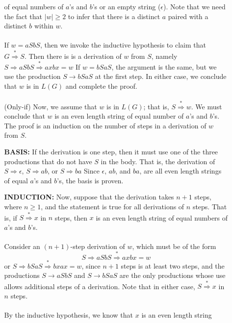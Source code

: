 \documentclass[]{article}
\begin{document}
\begin{enumerate}
\begin{enumerate}
        of equal numbers of $a$'s and $b$'s or an empty string ($\epsilon$).
        Note that we need the fact that $|w| \geq 2$ to infer that there is a
        distinct $a$ paired with a distinct $b$ within $w$. \\ \\
        If $w = aSbS$, then we invoke the inductive hypothesis to claim that
        $G\overset{*}{\Rightarrow} S$. Then there is is a derivation of $w$
        from $S$, namely $S \Rightarrow aSbS \overset{*}{\Rightarrow} axbx = w$
        If $w = bSaS$, the argument is the same, but we use the production
        $S \rightarrow bSaS$ at the first step. In either case, we conclude
        that $w$ is in $L(G)$ and complete the proof. \\ \\
        (Only-if) Now, we assume that $w$ is in $L(G)$; that is,
        $S \overset{*}{\Rightarrow} w$. We must conclude that $w$ is an even
        length string of equal number of $a$'s and $b$'s. The proof is an
        induction on the number of steps in a derivation of $w$ from $S$.
        \item[\textbf{BASIS:}] If the derivation is one step, then it must use
        one of the three productions that do not have $S$ in the body. That is,
        the derivation of $S \Rightarrow \epsilon$, $S \Rightarrow ab$, or
        $S \Rightarrow ba$ Since $\epsilon$, $ab$, and $ba$, are all even
        length strings of equal $a$'s and $b$'s, the basis is proven.
        \item[\textbf{INDUCTION:}] Now, suppose that the derivation takes $n+1$
        steps, where $n \geq 1$, and the statement is true for all derivations
        of $n$ steps. That is, if $S \overset{*}{\Rightarrow} x$ in $n$ steps,
        then $x$ is an even length string of equal numbers of $a$'s and $b$'s.
        \\\\
        Consider an $(n + 1)$-step derivation of $w$, which must be of the form
          \[ S \Rightarrow aSbS \overset{*}{\Rightarrow} axbx = w \]
        or $S \Rightarrow bSaS \overset{*}{\Rightarrow} bxax = w$, since
        $n + 1$ steps is at least two steps, and the productions
        $S \rightarrow aSbS$ and $S \rightarrow bSaS$ are the only productions
        whose use allows additional steps of a derivation. Note that in either
        case, $S \overset{*}{\Rightarrow} x$ in $n$ steps. \\\\
        By the inductive hypothesis, we know that $x$ is an even length string

\end{enumerate}
\end{enumerate}
\end{document}
